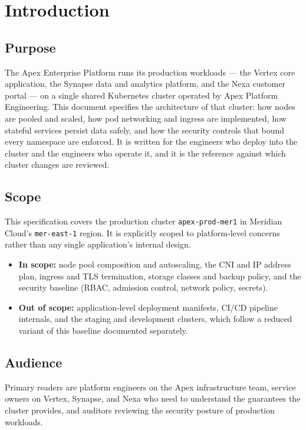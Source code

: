 \section{Introduction}

\subsection{Purpose}
The Apex Enterprise Platform runs its production workloads --- the Vertex core application, the Synapse data and analytics platform, and the Nexa customer portal --- on a single shared Kubernetes cluster operated by Apex Platform Engineering. This document specifies the architecture of that cluster: how nodes are pooled and scaled, how pod networking and ingress are implemented, how stateful services persist data safely, and how the security controls that bound every namespace are enforced. It is written for the engineers who deploy into the cluster and the engineers who operate it, and it is the reference against which cluster changes are reviewed.

\subsection{Scope}
This specification covers the production cluster \texttt{apex-prod-mer1} in Meridian Cloud's \texttt{mer-east-1} region. It is explicitly scoped to platform-level concerns rather than any single application's internal design.

\begin{itemize}[itemsep=2pt]
  \item \textbf{In scope:} node pool composition and autoscaling, the CNI and IP address plan, ingress and TLS termination, storage classes and backup policy, and the security baseline (RBAC, admission control, network policy, secrets).
  \item \textbf{Out of scope:} application-level deployment manifests, CI/CD pipeline internals, and the staging and development clusters, which follow a reduced variant of this baseline documented separately.
\end{itemize}

\subsection{Audience}
Primary readers are platform engineers on the Apex infrastructure team, service owners on Vertex, Synapse, and Nexa who need to understand the guarantees the cluster provides, and auditors reviewing the security posture of production workloads.

